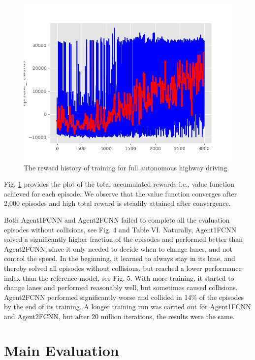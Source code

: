 \begin{figure}[h]
\centering
\includegraphics[width=1.0\textwidth]{figs/ch5/agent2-vehicle-reward-history-epoch-3000-std-track}
\caption{The reward history of training for full autonomous highway driving.}
\label{fig:res-2}
\end{figure}

Fig. \ref{fig:res-2} provides the plot of the total accumulated rewards i.e., value function achieved for each episode. We observe that the value function converges after 2,000 episodes and high total reward is steadily attained after convergence.

Both Agent1FCNN and Agent2FCNN failed to complete all the evaluation episodes without collisions, see Fig. 4 and Table VI. Naturally, Agent1FCNN solved a significantly higher fraction of the episodes and performed better than Agent2FCNN, since it only needed to decide when to change lanes, and not control the speed. In the beginning, it learned to always stay in its lane, and thereby solved all episodes without collisions, but reached a lower performance index than the reference model, see Fig. 5. With more training, it started to change lanes and performed reasonably well, but sometimes caused collisions. Agent2FCNN performed significantly worse and collided in 14\% of the episodes by the end of its training. A longer training run was carried out for Agent1FCNN and Agent2FCNN, but after 20 million iterations, the results were the same.

\section{Main Evaluation}

